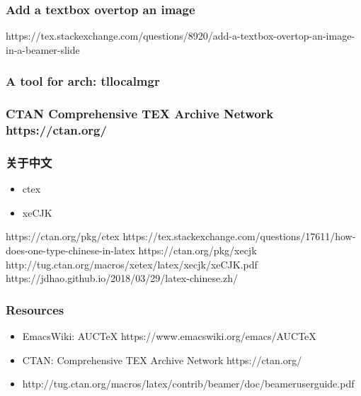 \documentclass[xetex, mathserif, UTF8]{beamer}
\begin{document}
\begin{frame}
  \frametitle{Add a textbox overtop an image}
  https://tex.stackexchange.com/questions/8920/add-a-textbox-overtop-an-image-in-a-beamer-slide
\end{frame}

\begin{frame}
  \frametitle{A tool for arch: tllocalmgr}
\end{frame}

\begin{frame}
  \frametitle{CTAN Comprehensive TEX Archive Network https://ctan.org/}
\end{frame}

\begin{frame}
  \frametitle{关于中文}
  \begin{itemize}
  \item ctex
  \item xeCJK
  \end{itemize}
  https://ctan.org/pkg/ctex
  https://tex.stackexchange.com/questions/17611/how-does-one-type-chinese-in-latex
  https://ctan.org/pkg/xecjk
  http://tug.ctan.org/macros/xetex/latex/xecjk/xeCJK.pdf
  https://jdhao.github.io/2018/03/29/latex-chinese.zh/
\end{frame}

\begin{frame}
  \frametitle{Resources}
  \begin{itemize}
  \item EmacsWiki: AUCTeX https://www.emacswiki.org/emacs/AUCTeX
  \item CTAN: Comprehensive TEX Archive Network https://ctan.org/
  \item http://tug.ctan.org/macros/latex/contrib/beamer/doc/beameruserguide.pdf
  \end{itemize}
\end{frame}
\end{document}

